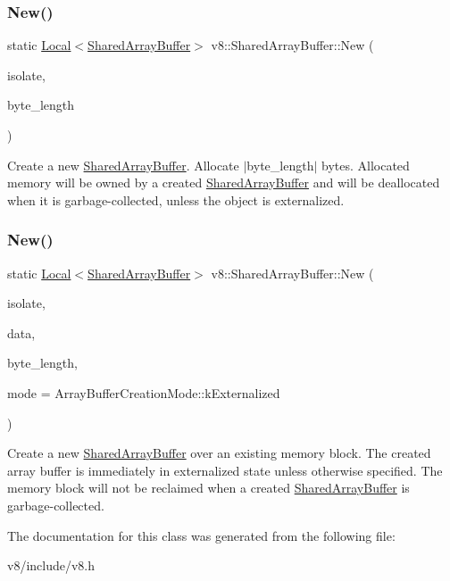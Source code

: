 \subsubsection{\texorpdfstring{New()}{New()}\hspace{0.1cm}{\footnotesize\ttfamily [1/2]}}
{\footnotesize\ttfamily static \mbox{\hyperlink{classv8_1_1Local}{Local}}$<$\mbox{\hyperlink{classv8_1_1SharedArrayBuffer}{Shared\+Array\+Buffer}}$>$ v8\+::\+Shared\+Array\+Buffer\+::\+New (\begin{DoxyParamCaption}\item[{Isolate $\ast$}]{isolate,  }\item[{size\+\_\+t}]{byte\+\_\+length }\end{DoxyParamCaption})\hspace{0.3cm}{\ttfamily [static]}}

Create a new \mbox{\hyperlink{classv8_1_1SharedArrayBuffer}{Shared\+Array\+Buffer}}. Allocate $\vert$byte\+\_\+length$\vert$ bytes. Allocated memory will be owned by a created \mbox{\hyperlink{classv8_1_1SharedArrayBuffer}{Shared\+Array\+Buffer}} and will be deallocated when it is garbage-\/collected, unless the object is externalized. \mbox{\label{classv8_1_1SharedArrayBuffer_af708b1765380ad42b7d572dfc531c21c}} 
\subsubsection{\texorpdfstring{New()}{New()}\hspace{0.1cm}{\footnotesize\ttfamily [2/2]}}
{\footnotesize\ttfamily static \mbox{\hyperlink{classv8_1_1Local}{Local}}$<$\mbox{\hyperlink{classv8_1_1SharedArrayBuffer}{Shared\+Array\+Buffer}}$>$ v8\+::\+Shared\+Array\+Buffer\+::\+New (\begin{DoxyParamCaption}\item[{Isolate $\ast$}]{isolate,  }\item[{void $\ast$}]{data,  }\item[{size\+\_\+t}]{byte\+\_\+length,  }\item[{Array\+Buffer\+Creation\+Mode}]{mode = {\ttfamily ArrayBufferCreationMode\+:\+:kExternalized} }\end{DoxyParamCaption})\hspace{0.3cm}{\ttfamily [static]}}

Create a new \mbox{\hyperlink{classv8_1_1SharedArrayBuffer}{Shared\+Array\+Buffer}} over an existing memory block. The created array buffer is immediately in externalized state unless otherwise specified. The memory block will not be reclaimed when a created \mbox{\hyperlink{classv8_1_1SharedArrayBuffer}{Shared\+Array\+Buffer}} is garbage-\/collected. 

The documentation for this class was generated from the following file\+:\begin{DoxyCompactItemize}
\item 
v8/include/v8.\+h\end{DoxyCompactItemize}
